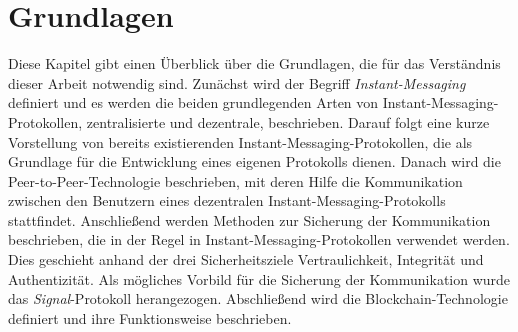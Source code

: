 \chapter{Grundlagen}
\label{chap:grundlagen}

Diese Kapitel gibt einen Überblick über die Grundlagen, die für das Verständnis dieser Arbeit notwendig sind. Zunächst wird der Begriff \textit{Instant-Messaging} definiert und es werden die beiden grundlegenden Arten von Instant-Messaging-Protokollen, zentralisierte und dezentrale, beschrieben. Darauf folgt eine kurze Vorstellung von bereits existierenden Instant-Messaging-Protokollen, die als Grundlage für die Entwicklung eines eigenen Protokolls dienen. Danach wird die Peer-to-Peer-Technologie beschrieben, mit deren Hilfe die Kommunikation zwischen den Benutzern eines dezentralen Instant-Messaging-Protokolls stattfindet. Anschließend werden Methoden zur Sicherung der Kommunikation  beschrieben, die in der Regel in Instant-Messaging-Protokollen verwendet werden. Dies geschieht anhand der drei Sicherheitsziele Vertraulichkeit, Integrität und Authentizität. Als mögliches Vorbild für die Sicherung der Kommunikation wurde das \textit{Signal}-Protokoll herangezogen. Abschließend wird die Blockchain-Technologie definiert und ihre Funktionsweise beschrieben.








